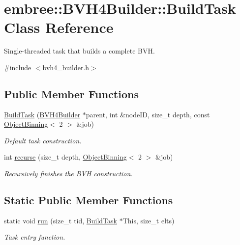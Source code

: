 \hypertarget{classembree_1_1_b_v_h4_builder_1_1_build_task}{
\section{embree::BVH4Builder::BuildTask Class Reference}
\label{classembree_1_1_b_v_h4_builder_1_1_build_task}
}


Single-\/threaded task that builds a complete BVH.  




{\ttfamily \#include $<$bvh4\_\-builder.h$>$}

\subsection*{Public Member Functions}
\begin{DoxyCompactItemize}
\item 
\hyperlink{classembree_1_1_b_v_h4_builder_1_1_build_task_a75b2b6f3d8c69148e4f8edc01bc6b3e7}{BuildTask} (\hyperlink{classembree_1_1_b_v_h4_builder}{BVH4Builder} $\ast$parent, int \&nodeID, size\_\-t depth, const \hyperlink{classembree_1_1_object_binning}{ObjectBinning}$<$ 2 $>$ \&job)
\begin{DoxyCompactList}\small\item\em Default task construction. \item\end{DoxyCompactList}\item 
int \hyperlink{classembree_1_1_b_v_h4_builder_1_1_build_task_acf52407fae5c1ac962391be94106ef95}{recurse} (size\_\-t depth, \hyperlink{classembree_1_1_object_binning}{ObjectBinning}$<$ 2 $>$ \&job)
\begin{DoxyCompactList}\small\item\em Recursively finishes the BVH construction. \item\end{DoxyCompactList}\end{DoxyCompactItemize}
\subsection*{Static Public Member Functions}
\begin{DoxyCompactItemize}
\item 
static void \hyperlink{classembree_1_1_b_v_h4_builder_1_1_build_task_a13adfdd8ea4668e533ad924d0e5dc5f0}{run} (size\_\-t tid, \hyperlink{classembree_1_1_b_v_h4_builder_1_1_build_task}{BuildTask} $\ast$This, size\_\-t elts)
\begin{DoxyCompactList}\small\item\em Task entry function. \item\end{DoxyCompactList}\end{DoxyCompactItemize}


